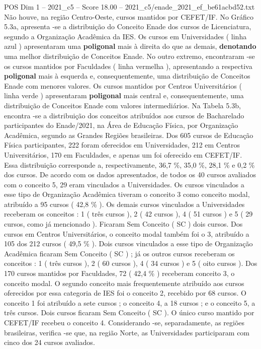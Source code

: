 \begin{textsample}{POS Dim 1 – 2021\_c5 – Score 18.00 – 2021\_c5/enade\_2021\_ef\_be61acbd52.txt}
Não houve, na região Centro-Oeste, cursos mantidos por CEFET/IF.
No Gráfico 5.3a, apresenta -se a distribuição do Conceito Enade dos cursos de Licenciatura, segundo a Organização Acadêmica da IES.
Os cursos em Universidades ( linha azul ) apresentaram uma \textbf{poligonal} mais à direita do que as demais, \textbf{denotando} uma melhor distribuição de Conceitos Enade.
No outro extremo, encontraram -se os cursos mantidos por Faculdades ( linha vermelha ), apresentando a respectiva \textbf{poligonal} mais à esquerda e, consequentemente, uma distribuição de Conceitos Enade com menores valores.
Os cursos mantidos por Centros Universitários ( linha verde ) apresentaram \textbf{poligonal} mais central e, consequentemente, uma distribuição de Conceitos Enade com valores intermediários.
Na Tabela 5.3b, encontra -se a distribuição dos conceitos atribuídos aos cursos de Bacharelado participantes do Enade/2021, na Área de Educação Física, por Organização Acadêmica, segundo as Grandes Regiões brasileiras.
Dos 605 cursos de Educação Física participantes, 222 foram oferecidos em Universidades, 212 em Centros Universitários, 170 em Faculdades, e apenas um foi oferecido em CEFET/IF.
Essa distribuição corresponde a, respectivamente, 36,7 \%, 35,0 \%, 28,1 \% e 0,2 \% dos cursos.
De acordo com os dados apresentados, de todos os 40 cursos avaliados com o conceito 5, 29 eram vinculados a Universidades.
Os cursos vinculados a esse tipo de Organização Acadêmica tiveram o conceito 3 como conceito modal, atribuído a 95 cursos ( 42,8 \% ).
Os demais cursos vinculados a Universidades receberam os conceitos : 1 ( três cursos ), 2 ( 42 cursos ), 4 ( 51 cursos ) e 5 ( 29 cursos, como já mencionado ).
Ficaram Sem Conceito ( SC ) dois cursos.
Dos cursos em Centros Universitários, o conceito modal também foi o 3, atribuído a 105 dos 212 cursos ( 49,5 \% ).
Dois cursos vinculados a esse tipo de Organização Acadêmica ficaram Sem Conceito ( SC ) ; já os outros cursos receberam os conceitos : 1 ( três cursos ), 2 ( 60 cursos ), 4 ( 34 cursos ) e 5 ( oito cursos ).
Dos 170 cursos mantidos por Faculdades, 72 ( 42,4 \% ) receberam conceito 3, o conceito modal.
O segundo conceito mais frequentemente atribuído aos cursos oferecidos por essa categoria de IES foi o conceito 2, recebido por 68 cursos.
O conceito 1 foi atribuído a sete cursos ; o conceito 4, a 18 cursos ; e o conceito 5, a três cursos.
Dois cursos ficaram Sem Conceito ( SC ).
O único curso mantido por CEFET/IF recebeu o conceito 4.
Considerando -se, separadamente, as regiões brasileiras, verifica -se que, na região Norte, as Universidades participaram com cinco dos 24 cursos avaliados.

\end{textsample}
